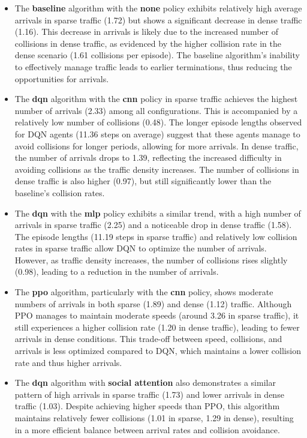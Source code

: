 \begin{itemize}
    \item The \textbf{baseline} algorithm with the \textbf{none} policy exhibits relatively high average arrivals in sparse traffic (1.72) but shows a significant decrease in dense traffic (1.16). This decrease in arrivals is likely due to the increased number of collisions in dense traffic, as evidenced by the higher collision rate in the dense scenario (1.61 collisions per episode). The baseline algorithm's inability to effectively manage traffic leads to earlier terminations, thus reducing the opportunities for arrivals.
    \item The \textbf{dqn} algorithm with the \textbf{cnn} policy in sparse traffic achieves the highest number of arrivals (2.33) among all configurations. This is accompanied by a relatively low number of collisions (0.48). The longer episode lengths observed for DQN agents (11.36 steps on average) suggest that these agents manage to avoid collisions for longer periods, allowing for more arrivals. In dense traffic, the number of arrivals drops to 1.39, reflecting the increased difficulty in avoiding collisions as the traffic density increases. The number of collisions in dense traffic is also higher (0.97), but still significantly lower than the baseline's collision rates.
    \item The \textbf{dqn} with the \textbf{mlp} policy exhibits a similar trend, with a high number of arrivals in sparse traffic (2.25) and a noticeable drop in dense traffic (1.58). The episode lengths (11.19 steps in sparse traffic) and relatively low collision rates in sparse traffic allow DQN to optimize the number of arrivals. However, as traffic density increases, the number of collisions rises slightly (0.98), leading to a reduction in the number of arrivals.
    \item The \textbf{ppo} algorithm, particularly with the \textbf{cnn} policy, shows moderate numbers of arrivals in both sparse (1.89) and dense (1.12) traffic. Although PPO manages to maintain moderate speeds (around 3.26 in sparse traffic), it still experiences a higher collision rate (1.20 in dense traffic), leading to fewer arrivals in dense conditions. This trade-off between speed, collisions, and arrivals is less optimized compared to DQN, which maintains a lower collision rate and thus higher arrivals.
    \item The \textbf{dqn} algorithm with \textbf{social attention} also demonstrates a similar pattern of high arrivals in sparse traffic (1.73) and lower arrivals in dense traffic (1.03). Despite achieving higher speeds than PPO, this algorithm maintains relatively fewer collisions (1.01 in sparse, 1.29 in dense), resulting in a more efficient balance between arrival rates and collision avoidance.
\end{itemize}

